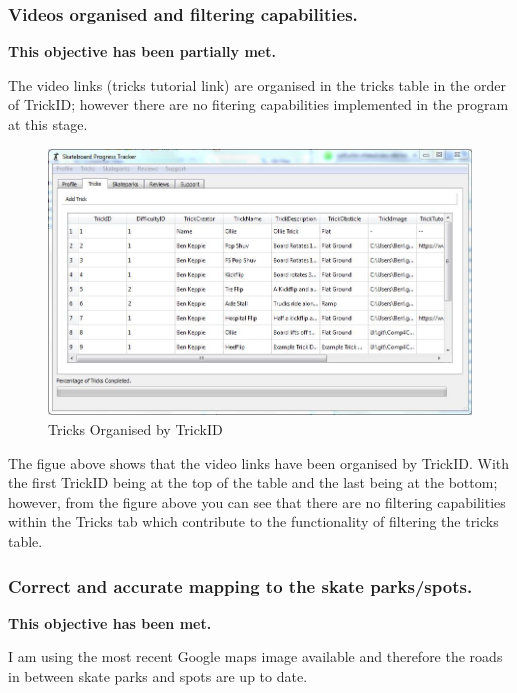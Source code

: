 \subsubsection{Videos organised and filtering capabilities.}

\textbf{This objective has been partially met.}

The video links (tricks tutorial link) are organised in the tricks table in the order of TrickID; however there are no fitering capabilities implemented in the program at this stage. 


\begin{figure}[H]
    \includegraphics[width=\textwidth]{./Evaluation/images/OrganisedTricks.jpg}
    \caption{Tricks Organised by TrickID} \label{fig:TricksOrganised}
\end{figure}

The figue above shows that the video links have been organised by TrickID. With the first TrickID being at the top of the table and the last being at the bottom; however, from the figure above you can see that there are no filtering capabilities within the Tricks tab which contribute to the functionality of filtering the tricks table.




\subsubsection{Correct and accurate mapping to the skate parks/spots.}

\textbf{This objective has been met.}

I am using the most recent Google maps image available and therefore the roads in between skate parks and spots are up to date.

